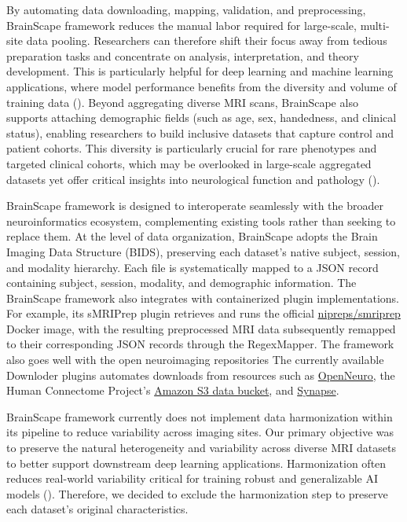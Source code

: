 By automating data downloading, mapping, validation, and preprocessing, BrainScape framework reduces the 
manual labor required for large-scale, multi-site data pooling. Researchers can therefore shift 
their focus away from tedious preparation tasks and concentrate on analysis, interpretation, and theory development. 
This is particularly helpful for deep learning and machine learning applications, where model 
performance benefits from the diversity and volume of training data (\cite{dishner2024survey}). Beyond aggregating diverse MRI scans, 
BrainScape also supports attaching demographic fields (such as age, sex, handedness, and clinical status), enabling 
researchers to build inclusive datasets that capture control and patient cohorts. 
This diversity is particularly crucial for rare phenotypes and targeted clinical cohorts, 
which may be overlooked in large-scale aggregated datasets yet offer critical insights into neurological function and pathology (\cite{thompson2014enigma}).

BrainScape framework is designed to interoperate seamlessly with the broader neuroinformatics ecosystem, 
complementing existing tools rather than seeking to replace them. 
At the level of data organization, BrainScape adopts the Brain Imaging Data Structure (BIDS), 
preserving each dataset's native subject, session, and modality hierarchy. 
Each file is systematically mapped to a JSON record containing subject, session, modality, and demographic information. 
The BrainScape framework also integrates with containerized plugin implementations. 
For example, its sMRIPrep plugin retrieves and runs the official \href{https://www.nipreps.org/smriprep/}{nipreps/smriprep} Docker image, 
with the resulting preprocessed MRI data subsequently remapped to their corresponding JSON records through the RegexMapper. 
The framework also goes well with the open neuroimaging repositories
The currently available Downloder plugins automates downloads from resources such as \href{https://openneuro.org/}{OpenNeuro}, 
the Human Connectome Project's \href{https://wiki.humanconnectome.org/docs/Using%20ConnectomeDB%20data%20on%20Amazon%20S3.html}{Amazon S3 data bucket}, 
and \href{https://www.synapse.org}{Synapse}. 

BrainScape framework currently does not implement data harmonization within its pipeline to reduce variability across imaging sites. 
Our primary objective was to preserve the natural heterogeneity and variability across diverse MRI datasets to better support 
downstream deep learning applications. Harmonization often reduces real-world variability critical for training robust and 
generalizable AI models (\cite{adkinson2024brain}).
Therefore, we decided to exclude the harmonization step to preserve each dataset's original characteristics.

